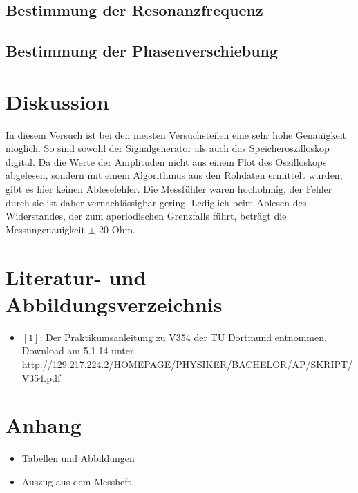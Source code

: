 \documentclass[11pt,ngerman,a4paper]{article}
\begin{document}
\subsection{Bestimmung der Resonanzfrequenz}
\subsection{Bestimmung der Phasenverschiebung}



\section{Diskussion}
In diesem Versuch ist bei den meisten Versuchsteilen eine sehr hohe Genauigkeit möglich. So sind sowohl der Signalgenerator als auch das Speicheroszilloskop digital. Da die Werte der Amplituden nicht aus einem Plot des Oszilloskops abgelesen, sondern mit einem Algorithmus aus den Rohdaten ermittelt wurden, gibt es hier keinen Ablesefehler. Die Messfühler waren hochohmig, der Fehler durch sie ist daher vernachlässigbar gering. Lediglich beim Ablesen des Widerstandes, der zum aperiodischen Grenzfalls führt, beträgt die Messungenauigkeit $\pm$ 20 Ohm.
\section{Literatur- und Abbildungsverzeichnis}
\begin{itemize}
\item $[1]$: Der Praktikumsanleitung zu V354 der TU Dortmund entnommen. Download am 5.1.14 unter \newline http://129.217.224.2/HOMEPAGE/PHYSIKER/BACHELOR/AP/SKRIPT/V354.pdf
\end{itemize}
\section{Anhang}
\begin{itemize}
\item Tabellen und Abbildungen
\item Auszug aus dem Messheft.


\end{itemize}
\end{document}
